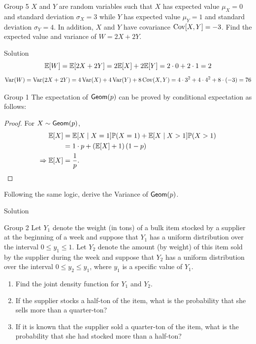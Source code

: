 \documentclass{article}
\begin{document}
\begin{problem}
    {Group 5}
    $X$ and $Y$ are random variables such that $X$ has expected value $\mu_X = 0$ and standard deviation $\sigma_X = 3$ while $Y$ has expected value $\mu_Y = 1$ and standard deviation $\sigma_Y = 4$. In addition, $X$ and $Y$ have covariance $\mathop{\mathrm{Cov}}\nolimits[X, Y] = -3$. Find the expected value and variance of $W = 2X+2Y$.
\end{problem}

\begin{solution}
    {Solution}
    \[
        \E{W} = \E{2X+2Y} = 2\E{X}+2\E{Y} = 2\cdot 0+2\cdot 1 = 2
    \]
    \[
        \mathop{\mathrm{Var}}\nolimits(W) = \mathop{\mathrm{Var}}\nolimits(2X+2Y) = 4\mathop{\mathrm{Var}}\nolimits(X)+4\mathop{\mathrm{Var}}\nolimits(Y)+8\mathop{\mathrm{Cov}}\nolimits(X,Y) = 4\cdot 3^2+4\cdot 4^2+8\cdot (-3) = 76
    \]
\end{solution}
\fi
\begin{problem}
    {Group 1}
    The expectation of $\mathsf{Geom}(p)$ can be proved by conditional expectation as follows:
    \begin{proof}
        For $X\sim\mathsf{Geom}(p)$,
        \begin{align*}
            \E{X}
            &= \condE{X}{X=1}\P{X=1}+\condE{X}{X>1}\P{X>1}\\
            &= 1\cdot p + \left(\E{X}+1\right)(1-p)\\
            \Rightarrow
            \E{X} &= \frac{1}{p}.
        \end{align*}
    \end{proof}
    Following the same logic, derive the Variance of $\mathsf{Geom}(p)$.
\end{problem}

\begin{solution}
    {Solution}
    
\end{solution}

\begin{problem}
    {Group 2}
    Let $Y_1$ denote the weight (in tons) of a bulk item stocked by a supplier at the beginning of a week and suppose that $Y_1$ has a uniform distribution over the interval $0 \leq y_1 \leq 1$. Let $Y_2$ denote the amount (by weight) of this item sold by the supplier during the week and suppose that $Y_2$ has a uniform distribution over the interval $0 \leq y_2 \leq y_1$, where $y_1$ is a specific value of $Y_1$.
    \begin{enumerate}
        \item Find the joint density function for $Y_1$ and $Y_2$.
        \item If the supplier stocks a half-ton of the item, what is the probability that she sells more than a quarter-ton?
        \item If it is known that the supplier sold a quarter-ton of the item, what is the probability that she had stocked more than a half-ton?
    \end{enumerate}
\end{problem}
\end{document}

